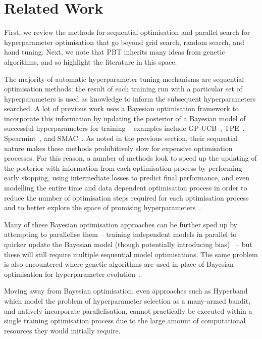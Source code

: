 \section{Related Work}\label{sec:related}

First, we review the methods for sequential optimisation and parallel search for hyperparameter optimisation that go beyond grid search, random search, and hand tuning. Next, we note that PBT inherits many ideas from genetic algorithms, and so highlight the literature in this space.

The majority of automatic hyperparameter tuning mechanisms are sequential optimisation methods: the result of each training run with a particular set of hyperparameters is used as knowledge to inform the subsequent hyperparameters searched. A lot of previous work uses a Bayesian optimisation framework to incorporate this information by updating the posterior of a Bayesian model of successful hyperparameters for training -- examples include GP-UCB~\citep{srinivas2009gaussian}, TPE~\citep{bergstra2011algorithms}, Spearmint~\citep{snoek2012practical}, and SMAC~\citep{hutter2011sequential}. As noted in the previous section, their sequential nature makes these methods prohibitively slow for expensive optimisation processes. For this reason, a number of methods look to speed up the updating of the posterior with information from each optimisation process by performing early stopping, using intermediate losses to predict final performance, and even modelling the entire time and data dependent optimisation process in order to reduce the number of optimisation steps required for each optimisation process and to better explore the space of promising hyperparameters~\citep{gyorgy2011efficient,agarwal2011oracle,sabharwal2016selecting,swersky2013multi,swersky2014freeze,domhan2015speeding,klein2016fast,snoek2015scalable,springenberg2016bayesian}. 

Many of these Bayesian optimisation approaches can be further sped up by attempting to parallelise them -- training independent models in parallel to quicker update the Bayesian model (though potentially introducing bias)~\citep{shah2015parallel,gonzalez2016batch,wu2016parallel,rasley2017hyperdrive,golovin2017google} -- but these will still require multiple sequential model optimisations. The same problem is also encountered where genetic algorithms are used in place of Bayesian optimisation for hyperparameter evolution~\citep{young2015optimizing}.

Moving away from Bayesian optimisation, even approaches such as Hyperband~\citep{li2016hyperband} which model the problem of hyperparameter selection as a many-armed bandit, and natively incorporate parallelisation, cannot practically be executed within a single training optimisation process due to the large amount of computational resources they would initially require.

